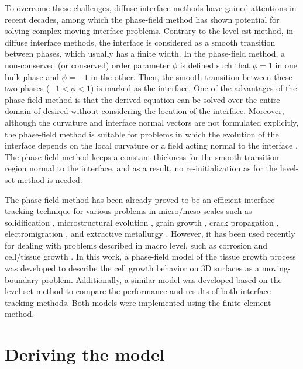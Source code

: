 To overcome these challenges, diffuse interface methods \cite{Anderson1998} have gained attentions in recent decades, among which the phase-field method has shown potential for solving complex moving interface problems. Contrary to the level-est method, in diffuse interface methods, the interface is considered as a smooth transition between phases, which usually has a finite width. In the phase-field method, a non-conserved (or conserved) order parameter $\phi$ is defined such that $\phi=1$ in one bulk phase and $\phi=-1$ in the other. Then, the smooth transition between these two phases ($-1<\phi<1$) is marked as the interface. One of the advantages of the phase-field method is that the derived equation can be solved over the entire domain of desired without considering the location of the interface. Moreover, although the curvature and interface normal vectors are not formulated explicitly, the phase-field method is suitable for problems in which the evolution of the interface depends on the local curvature or a field acting normal to the interface \cite{Sun2007}. The phase-field method keeps a constant thickness for the smooth transition region normal to the interface, and as a result, no re-initialization as for the level-set method is needed.



The phase-field method has been already proved to be an efficient interface tracking technique for various problems in micro/meso scales such as solidification \cite{Karma1998,Boettinger2002}, microstructural evolution \cite{Chen2002}, grain growth \cite{Chen1994}, crack propagation \cite{Henry2004,Spatschek2011}, electromigration \cite{Bhate2000}, and extractive metallurgy \cite{Bellemans2017}. However, it has been used recently for dealing with problems described in macro level, such as corrosion \cite{Mai2016,Lin2019,Imanian2018,Lin2020,Ansari2018,Tsuyuki2018,Chadwick2018} and cell/tissue growth \cite{Jeong2017,Lee2019}. In this work, a phase-field model of the tissue growth process was developed to describe the  cell growth behavior on 3D surfaces as a moving-boundary problem. Additionally, a similar model was developed based on the level-set method to compare the performance and results of both interface tracking methods. Both models were implemented using the finite element method. 


\section{Deriving the model}

